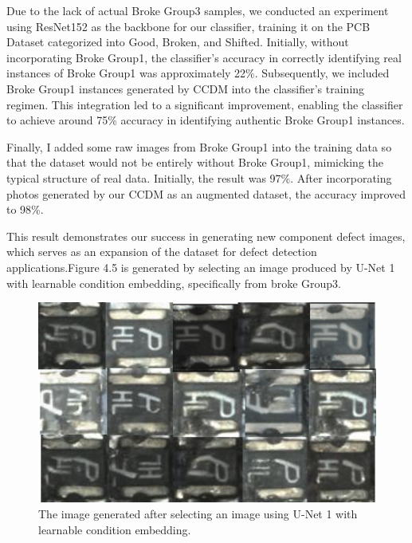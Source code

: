 Due to the lack of actual Broke Group3 samples, we conducted an experiment using ResNet152 as the backbone for our classifier, training it on the PCB Dataset categorized into Good, Broken, and Shifted. Initially, without incorporating Broke Group1, the classifier's accuracy in correctly identifying real instances of Broke Group1 was approximately 22\%. Subsequently, we included Broke Group1 instances generated by CCDM into the classifier's training regimen. This integration led to a significant improvement, enabling the classifier to achieve around 75\% accuracy in identifying authentic Broke Group1 instances. 

Finally, I added some raw images from Broke Group1 into the training data so that the dataset would not be entirely without Broke Group1, mimicking the typical structure of real data. Initially, the result was 97\%. After incorporating photos generated by our CCDM as an augmented dataset, the accuracy improved to 98\%. 

This result demonstrates our success in generating new component defect images, which serves as an expansion of the dataset for defect detection applications.Figure 4.5 is generated by selecting an image produced by U-Net 1 with learnable condition embedding, specifically from broke Group3.

\begin{figure}[H]
    \centering
    \includegraphics[width=0.75\linewidth]{Generate image.png}
    \caption{The image generated after selecting an image using U-Net 1 with learnable condition embedding.}
    \label{fig:enter-label}
\end{figure}